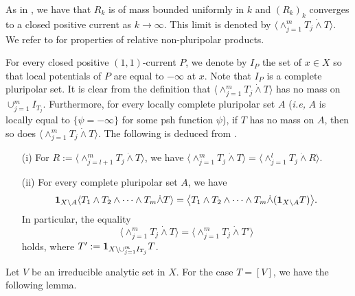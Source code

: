     As in \cite{BEGZ}, we have that $R_k$ is of mass bounded uniformly in $k$ and $(R_k)_k$ converges to a closed positive current as $k \to \infty$. This limit is denoted by $\langle \wedge_{j=1}^m T_j \dot{\wedge} T\rangle$.  
    We refer to  \cite[Proposition 3.5]{Viet-generalized-nonpluri} for properties of relative non-pluripolar products. 


    For every closed positive $(1,1)$-current $P$, we denote by $I_P$ the set of $x \in X$ so that local potentials of $P$ are equal to $-\infty$ at $x$. Note that $I_P$ is  a  complete pluripolar set.  It is clear from the definition that $\langle \wedge_{j=1}^m T_j \dot{\wedge} T\rangle$ has no mass on $\cup_{j=1}^m I_{T_j}$. Furthermore, for every locally complete pluripolar set $A$ (\emph{i.e,} $A$ is locally equal to $\{\psi= -\infty\}$ for some psh function $\psi$), if $T$ has no mass on $A$, then so does $\langle \wedge_{j=1}^m T_j \dot{\wedge} T\rangle$.  The following is deduced from \cite[Proposition 3.5]{Viet-generalized-nonpluri}.

    \begin{proposition}\label{pro-sublinearnonpluripolar} 
        \begin{itemize}
            \item[(i)]For $R:= \langle \wedge_{j=l+1}^m T_j \dot{\wedge} T \rangle$, we have $\langle \wedge_{j=1}^m T_j \dot{\wedge} T \rangle = \langle \wedge_{j=1}^l T_j \dot{\wedge} R \rangle$.

            \item[(ii)]For every complete pluripolar set $A$, we have 
            $$\bold{1}_{X \backslash A}\langle  T_1 \wedge T_2 \wedge \cdots \wedge T_m \dot{\wedge} T\rangle= \big\langle  T_1 \wedge T_2 \wedge \cdots \wedge T_m \dot{\wedge}(\bold{1}_{X \backslash A} T)\big\rangle.$$
            In particular, the equality
            $$\langle \wedge_{j=1}^m T_j \dot{\wedge} T \rangle = \langle \wedge_{j=1}^m T_j \dot{\wedge} T' \rangle$$
            holds, where $T':= \bold{1}_{X \backslash \cup_{j=1}^m I_{T_j}} T$.
        \end{itemize}

    \end{proposition}



    Let $V$ be an irreducible analytic set in $X$. For the case $T=[V]$, we have the following lemma.



